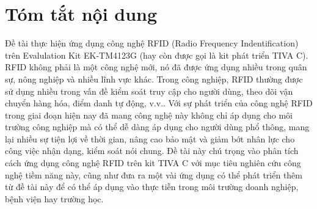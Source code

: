 \chapter*{Tóm tắt nội dung}
Đề tài thực hiện ứng dụng công nghệ RFID (Radio Frequency Indentification) trên Evalulation Kit EK-TM4123G (hay còn được gọi là kit phát triển TIVA C).
RFID không phải là một công nghệ mới, nó đã được ứng dụng nhiều trong quân sự, nông nghiệp và nhiều lĩnh vực khác.
Trong công nghiệp, RFID thường được sử dụng nhiều trong vấn đề kiểm soát truy cập cho người dùng, theo dõi vận chuyển hàng hóa, điểm danh tự động, v.v..
Với sự phát triển của công nghệ RFID trong giai đoạn hiện nay đã mang công nghệ này không chỉ áp dụng cho môi trường công nghiệp mà có thể dễ dàng áp dụng cho người dùng phổ thông, mang lại nhiều sự tiện lợi về thời gian, nâng cao bảo mật và giảm bớt nhân lực cho công việc nhận dạng, kiểm soát nói chung.
Đề tài này chú trọng vào phân tích cách ứng dụng công nghệ RFID trên kit TIVA C với mục tiêu nghiên cứu công nghệ tiềm năng này,
cũng như đưa ra một vài ứng dụng có thể phát triển thêm từ đề tài này để có thể áp dụng vào thực tiễn trong môi trường doanh nghiệp, bệnh viện hay trường học.
